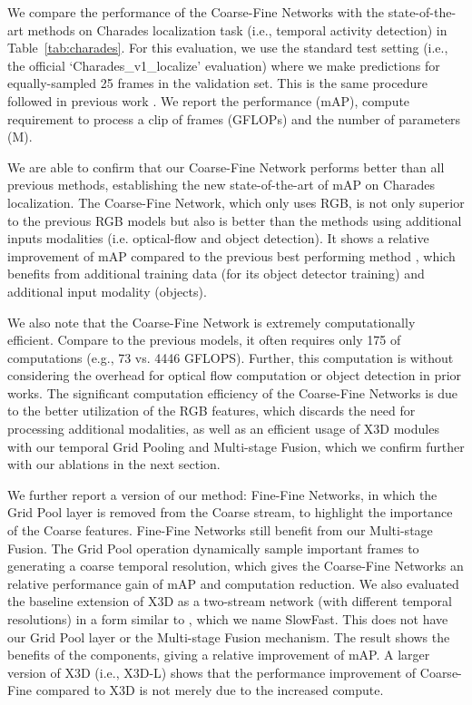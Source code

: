 \documentclass[final]{cvpr}
\newcommand{\tref}[1]{Table~\ref{#1}}
\begin{document}
We compare the performance of the Coarse-Fine Networks with the state-of-the-art methods on Charades \cite{sigurdsson2016hollywood} localization task (i.e., temporal activity detection) in \tref{tab:charades}. For this evaluation, we use the standard test setting (i.e., the official `Charades\_v1\_localize' evaluation) where we make predictions for equally-sampled 25 frames in the validation set. This is the same procedure followed in previous work \cite{piergiovanni2018learning, piergiovanni2019temporal, mavroudi2020representation}. We report the performance (mAP), compute requirement to process a clip of  frames (GFLOPs) and the number of parameters (M). 

We are able to confirm that our Coarse-Fine Network performs better than all previous methods, establishing the new state-of-the-art of  mAP on Charades localization. The Coarse-Fine Network, which only uses RGB, is not only superior to the previous RGB models but also is better than the methods using additional inputs modalities (i.e. optical-flow and object detection). It shows a relative improvement of  mAP compared to the previous best performing method \cite{mavroudi2020representation}, which benefits from additional training data (for its object detector training) and additional input modality (objects). 

We also note that the Coarse-Fine Network is extremely computationally efficient. Compare to the previous models,
it often requires only 175 of computations (e.g., 73 vs. 4446 GFLOPS). Further, this computation is without considering the overhead for optical flow computation or object detection in prior works. 
The significant computation efficiency of the Coarse-Fine Networks is due to the better utilization of the RGB features, which discards the need for processing additional modalities, as well as an efficient usage of X3D modules with our temporal Grid Pooling and Multi-stage Fusion, which we confirm further with our ablations in the next section.





We further report a version of our method: Fine-Fine Networks, in which the Grid Pool layer is removed from the Coarse stream, to highlight the importance of the Coarse features. Fine-Fine Networks still benefit from our Multi-stage Fusion. The Grid Pool operation dynamically sample important frames to generating a coarse temporal resolution, which gives the Coarse-Fine Networks an relative performance gain of  mAP and  computation reduction. We also evaluated the baseline extension of X3D as a two-stream network (with different temporal resolutions) in a form similar to \cite{feichtenhofer2019slowfast}, which we name SlowFast. This does not have our Grid Pool layer or the Multi-stage Fusion mechanism. The result shows the benefits of the components, giving a relative improvement of mAP. A larger version of X3D (i.e., X3D-L) shows that the performance improvement of Coarse-Fine compared to X3D is not merely due to the increased compute.
\end{document}
